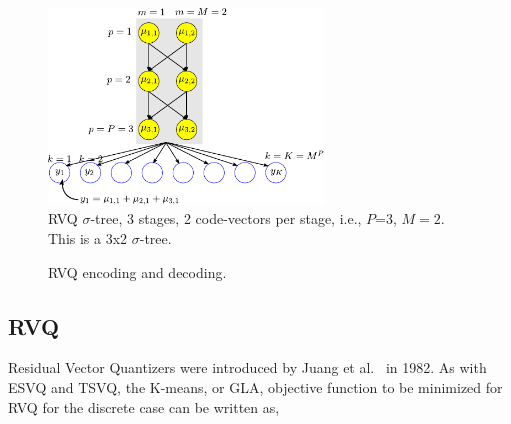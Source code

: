 								\begin{figure}[t]
								\centering	
								\includegraphics[width=0.65\textwidth]{thesis/RVQ_trellis.pdf}
								\caption{RVQ $\sigma$-tree, 3 stages, 2 code-vectors per stage, i.e., $P$=3, $M=2$.  This is a 3x2 $\sigma$-tree.} 
								\label{fig:RVQ_sigma_tree}				
								\end{figure}


								\begin{figure}[t]	
								\centering			
								\caption{RVQ encoding and decoding.}
								\label{fig:RVQ_encoding_decoding}
								\end{figure}
\subsection{RVQ}
Residual Vector Quantizers were introduced by Juang et al.~\cite{1982_CNF_SpeechRVQ_JuangGray} in 1982.  As with ESVQ and TSVQ, the K-means, or GLA, objective function to be minimized for RVQ for the discrete case can be written as,

